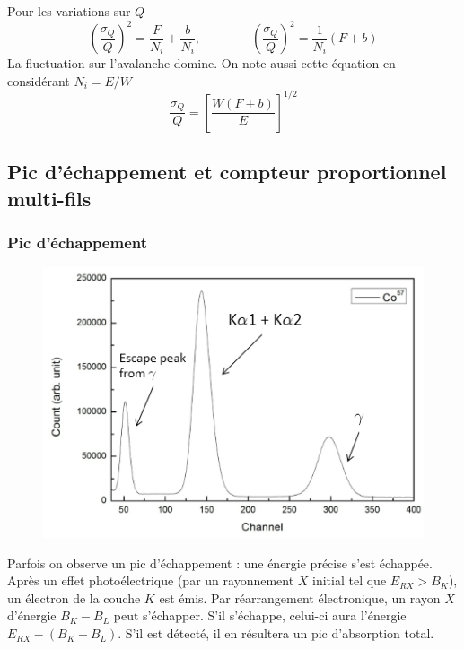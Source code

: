 Pour les variations sur $Q$
\begin{equation}
\left(\frac{\sigma_{Q}}{Q}\right)^2=\frac{F}{N_i}+\frac{b}{N_i},\qquad\qquad
\left(\frac{\sigma_{Q}}{Q}\right)^2=\frac{1}{N_i}(F+b)
\end{equation}
La fluctuation sur l'avalanche domine. On note aussi cette équation en considérant $N_i=E/W$
\begin{equation}
\frac{\sigma_{Q}}{Q}=\left[\frac{W(F+b)}{E}\right]^{1/2}
\end{equation}



\subsection{Pic d'échappement et compteur proportionnel multi-fils}%
\subsubsection{Pic d'échappement}
	\begin{figure}
	\vspace{-5mm}
	\includegraphics[scale=0.5]{ch8/image11}
	\end{figure}
Parfois on observe un pic d'échappement : une énergie précise s'est échappée. Après un effet
photoélectrique (par un rayonnement $X$ initial tel que $E_{RX} > B_K$), un 
électron de la couche $K$ est émis. Par réarrangement électronique, un rayon $X$ d'énergie
$B_K-B_L$ peut s'échapper. S'il s'échappe, celui-ci aura l'énergie $E_{RX}-(B_K-B_L)$. S'il
est détecté, il en résultera un pic d'absorption total.	\\
\ \\

